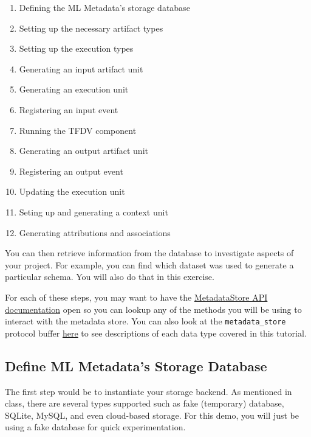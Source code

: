 \documentclass[11pt]{article}
\providecommand{\tightlist}{%
      \setlength{\itemsep}{0pt}\setlength{\parskip}{0pt}}
\begin{document}
\begin{enumerate}
\def\labelenumi{\arabic{enumi}.}
\tightlist
\item
  Defining the ML Metadata's storage database
\item
  Setting up the necessary artifact types
\item
  Setting up the execution types
\item
  Generating an input artifact unit
\item
  Generating an execution unit
\item
  Registering an input event
\item
  Running the TFDV component
\item
  Generating an output artifact unit
\item
  Registering an output event
\item
  Updating the execution unit
\item
  Seting up and generating a context unit
\item
  Generating attributions and associations
\end{enumerate}

You can then retrieve information from the database to investigate
aspects of your project. For example, you can find which dataset was
used to generate a particular schema. You will also do that in this
exercise.

For each of these steps, you may want to have the
\href{https://www.tensorflow.org/tfx/ml_metadata/api_docs/python/mlmd/MetadataStore}{MetadataStore
API documentation} open so you can lookup any of the methods you will be
using to interact with the metadata store. You can also look at the
\texttt{metadata\_store} protocol buffer
\href{https://github.com/google/ml-metadata/blob/r0.24.0/ml_metadata/proto/metadata_store.proto}{here}
to see descriptions of each data type covered in this tutorial.

    \hypertarget{define-ml-metadatas-storage-database}{%
\subsection{Define ML Metadata's Storage
Database}\label{define-ml-metadatas-storage-database}}

The first step would be to instantiate your storage backend. As
mentioned in class, there are several types supported such as fake
(temporary) database, SQLite, MySQL, and even cloud-based storage. For
this demo, you will just be using a fake database for quick
experimentation.
\end{document}
